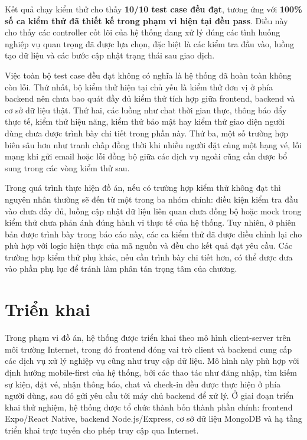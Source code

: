 \documentclass[../DoAn.tex]{subfiles}
\begin{document}
Kết quả chạy kiểm thử cho thấy \textbf{10/10 test case đều đạt}, tương ứng với \textbf{100\% số ca kiểm thử đã thiết kế trong phạm vi hiện tại đều pass}. Điều này cho thấy các controller cốt lõi của hệ thống đang xử lý đúng các tình huống nghiệp vụ quan trọng đã được lựa chọn, đặc biệt là các kiểm tra đầu vào, luồng tạo dữ liệu và các bước cập nhật trạng thái sau giao dịch.

Việc toàn bộ test case đều đạt không có nghĩa là hệ thống đã hoàn toàn không còn lỗi. Thứ nhất, bộ kiểm thử hiện tại chủ yếu là kiểm thử đơn vị ở phía backend nên chưa bao quát đầy đủ kiểm thử tích hợp giữa frontend, backend và cơ sở dữ liệu thật. Thứ hai, các luồng như chat thời gian thực, thông báo đẩy thực tế, kiểm thử hiệu năng, kiểm thử bảo mật hay kiểm thử giao diện người dùng chưa được trình bày chi tiết trong phần này. Thứ ba, một số trường hợp biên sâu hơn như tranh chấp đồng thời khi nhiều người đặt cùng một hạng vé, lỗi mạng khi gửi email hoặc lỗi đồng bộ giữa các dịch vụ ngoài cũng cần được bổ sung trong các vòng kiểm thử sau.

Trong quá trình thực hiện đồ án, nếu có trường hợp kiểm thử không đạt thì nguyên nhân thường sẽ đến từ một trong ba nhóm chính: điều kiện kiểm tra đầu vào chưa đầy đủ, luồng cập nhật dữ liệu liên quan chưa đồng bộ hoặc mock trong kiểm thử chưa phản ánh đúng hành vi thực tế của hệ thống. Tuy nhiên, ở phiên bản được trình bày trong báo cáo này, các ca kiểm thử đã được điều chỉnh lại cho phù hợp với logic hiện thực của mã nguồn và đều cho kết quả đạt yêu cầu. Các trường hợp kiểm thử phụ khác, nếu cần trình bày chi tiết hơn, có thể được đưa vào phần phụ lục để tránh làm phân tán trọng tâm của chương.
\section{Triển khai}
Trong phạm vi đồ án, hệ thống được triển khai theo mô hình client-server trên môi trường Internet, trong đó frontend đóng vai trò client và backend cung cấp các dịch vụ xử lý nghiệp vụ cũng như truy cập dữ liệu. Mô hình này phù hợp với định hướng mobile-first của hệ thống, bởi các thao tác như đăng nhập, tìm kiếm sự kiện, đặt vé, nhận thông báo, chat và check-in đều được thực hiện ở phía người dùng, sau đó gửi yêu cầu tới máy chủ backend để xử lý. Ở giai đoạn triển khai thử nghiệm, hệ thống được tổ chức thành bốn thành phần chính: frontend Expo/React Native, backend Node.js/Express, cơ sở dữ liệu MongoDB và hạ tầng triển khai trực tuyến cho phép truy cập qua Internet.
\end{document}
